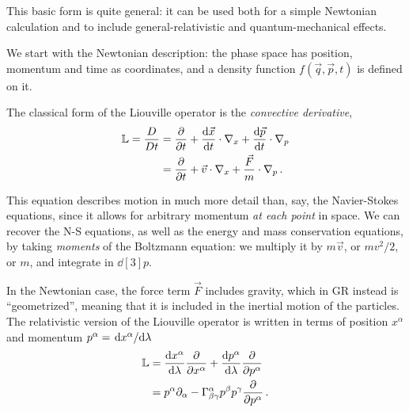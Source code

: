 \documentclass[main.tex]{subfiles}
\begin{document}
This basic form is quite general: it can be used both for a simple Newtonian calculation and to include general-relativistic and quantum-mechanical effects.

We start with the Newtonian description: the phase space has position, momentum and time as coordinates, and a density function \(f(\vec{q}, \vec{p}, t)\) is defined on it. 


The classical form of the Liouville operator is the \emph{convective derivative},
%
\begin{subequations}
\begin{align}
  \mathbb{L} = \frac{D}{Dt} &= \pdv{}{t} + \dv{\vec{x}}{t} \cdot \nabla_x + \dv{\vec{p}}{t} \cdot \nabla_p   \\
  &= \pdv{}{t} + \vec{v} \cdot \nabla_x + \frac{\vec{F}}{m} \cdot \nabla_p 
\,. 
\end{align}
\end{subequations}

This equation describes motion in much more detail than, say, the Navier-Stokes equations, since it allows for arbitrary momentum \emph{at each point} in space. 
We can recover the N-S equations, as well as the energy and mass conservation equations, by taking \emph{moments} of the Boltzmann equation: we multiply it by \(m \vec{v}\), or \(m v^2 / 2\), or \(m\), and integrate in \(\dd[3]{p}\).

In the Newtonian case, the force term \(\vec{F}\) includes gravity, which in GR instead is ``geometrized'', meaning that it is included in the inertial motion of the particles. 
The relativistic version of the Liouville operator is written in terms of position \(x^{\alpha }\) and momentum \(p^{\alpha } = \dv*{x^{\alpha }}{\lambda }\)
%
\begin{align}
\mathbb{L} 
&= \dv{x^{\alpha }}{\lambda } \pdv{}{x^{\alpha }} 
+ \dv{p^{\alpha }}{\lambda } \pdv{}{p^{\alpha }} \\ 
&= p^{\alpha } \partial_{\alpha } - \Gamma^{\alpha }_{\beta \gamma } p^{\beta } p^{\gamma } \pdv{}{p^{\alpha }}
\,.
\end{align}
\end{document}
